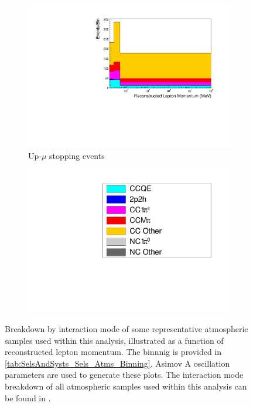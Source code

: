 \begin{figure}[ht]
\begin{subfigure}[t]{0.49\textwidth}
    \includegraphics[width=\textwidth, trim= 0 0 0 30, clip]{Figures/Selections/AtmSpectra_ByMode/UpStop-mu_X.pdf}
    \caption{Up-$\mu$ stopping events}
    \end{subfigure}%
    \begin{subfigure}[t]{0.49\textwidth}
    \includegraphics[page=1,width=\textwidth, trim= 0 0 0 30, clip]{Figures/Selections/AtmSpectra_ByMode/Legend.pdf}
    \end{subfigure}
    \caption{Breakdown by interaction mode of some representative atmospheric samples used within this analysis, illustrated as a function of reconstructed lepton momentum. The binnnig is provided in \autoref{tab:SelsAndSysts_Sels_Atms_Binning}. Asimov A oscillation parameters are used to generate these plots. The interaction mode breakdown of all atmospheric samples used within this analysis can be found in \cite{t2k_tn_422}. }
    \label{fig:SKSamples:ByModeBreakdown}
\end{figure}

